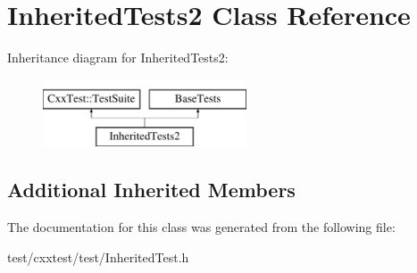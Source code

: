 \hypertarget{classInheritedTests2}{\section{Inherited\-Tests2 Class Reference}
\label{classInheritedTests2}
}
Inheritance diagram for Inherited\-Tests2\-:\begin{figure}[H]
\begin{center}
\leavevmode
\includegraphics[height=2.000000cm]{classInheritedTests2}
\end{center}
\end{figure}
\subsection*{Additional Inherited Members}


The documentation for this class was generated from the following file\-:\begin{DoxyCompactItemize}
\item 
test/cxxtest/test/Inherited\-Test.\-h\end{DoxyCompactItemize}
